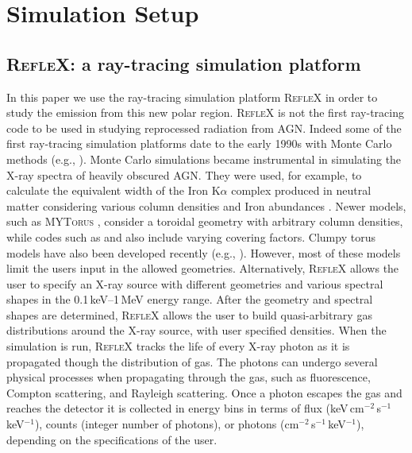 \documentclass[fleqn,usenatbib]{mnras}
\begin{document}
\section{Simulation Setup}

    \subsection{\textsc{RefleX}: a ray-tracing simulation platform}
    
        In this paper we use the ray-tracing simulation platform \textsc{RefleX} \citep{RefleX} in order to study the emission from this new polar region. \textsc{RefleX} is not the first  ray-tracing code to be used in studying reprocessed radiation from AGN. Indeed some of the first ray-tracing simulation platforms date to the early 1990s with Monte Carlo methods (e.g., \citealp{1991MNRAS.249..352G}). Monte Carlo simulations became instrumental in simulating the X-ray spectra of heavily obscured AGN. They were used, for example, to calculate the equivalent width of the Iron K$\alpha$ complex produced in neutral matter considering various column densities and Iron abundances \citep{2002MNRAS.337..147M}. Newer models, such as \textsc{MYTorus} \citep{10.1111/j.1365-2966.2009.15025.x}, consider a toroidal geometry with arbitrary column densities, while codes such as \cite{2011MNRAS.413.1206B} and \cite{2018ApJ...854...42B} also include varying covering factors. Clumpy torus models have also been developed recently (e.g., \citealp{2014ApJ...787...52L, 2019A&A...629A..16B}). However, most of these models limit the users input in the allowed geometries. Alternatively, \textsc{RefleX} allows the user to specify an X-ray source with different geometries and various spectral shapes in the 0.1\,keV--1\,MeV energy range. After the geometry and spectral shapes are determined, \textsc{RefleX} allows the user to build quasi-arbitrary gas distributions around the X-ray source, with user specified densities. When the simulation is run, \textsc{RefleX} tracks the life of every X-ray photon as it is propagated though the distribution of gas. The photons can undergo several physical processes when propagating through the gas, such as fluorescence, Compton scattering, and Rayleigh scattering. Once a photon escapes the gas and reaches the detector it is collected in energy bins in terms of flux (keV\,cm$^{-2}$\,s$^{-1}$\,keV$^{-1}$), counts (integer number of photons), or photons (cm$^{-2}$\,s$^{-1}$\,keV$^{-1}$), depending on the specifications of the user.
        
\end{document}
